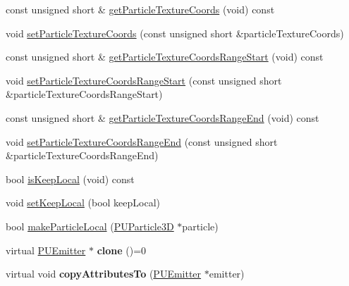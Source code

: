 \begin{DoxyCompactItemize}
\item 
const unsigned short \& \hyperlink{classPUEmitter_a0d3882c1739c1252b6524ac65db23199}{get\+Particle\+Texture\+Coords} (void) const
\item 
void \hyperlink{classPUEmitter_a400b39eba5fa388728c51eda60b11163}{set\+Particle\+Texture\+Coords} (const unsigned short \&particle\+Texture\+Coords)
\item 
const unsigned short \& \hyperlink{classPUEmitter_adc3c964789b1972f9488d8aef6cf860d}{get\+Particle\+Texture\+Coords\+Range\+Start} (void) const
\item 
void \hyperlink{classPUEmitter_a52c268b861b30c2870665e13df528015}{set\+Particle\+Texture\+Coords\+Range\+Start} (const unsigned short \&particle\+Texture\+Coords\+Range\+Start)
\item 
const unsigned short \& \hyperlink{classPUEmitter_a005ddbb5f416e9f4843f9545d861bd46}{get\+Particle\+Texture\+Coords\+Range\+End} (void) const
\item 
void \hyperlink{classPUEmitter_adedd188e230448e37af079e08833d23e}{set\+Particle\+Texture\+Coords\+Range\+End} (const unsigned short \&particle\+Texture\+Coords\+Range\+End)
\item 
bool \hyperlink{classPUEmitter_a6562e7de28fec95a73a66e7d1e59cc57}{is\+Keep\+Local} (void) const
\item 
void \hyperlink{classPUEmitter_ad53330b258cf796c7e0000089cb1a6fa}{set\+Keep\+Local} (bool keep\+Local)
\item 
bool \hyperlink{classPUEmitter_a100dc4d1701077246a469bf30f0b483f}{make\+Particle\+Local} (\hyperlink{structPUParticle3D}{P\+U\+Particle3D} $\ast$particle)
\item 
\mbox{\label{classPUEmitter_aad71994880c0fdd33a2f6e892026347c}} 
virtual \hyperlink{classPUEmitter}{P\+U\+Emitter} $\ast$ {\bfseries clone} ()=0
\item 
\mbox{\label{classPUEmitter_a3c9d3c269bca508246b8c6689d2893ae}} 
virtual void {\bfseries copy\+Attributes\+To} (\hyperlink{classPUEmitter}{P\+U\+Emitter} $\ast$emitter)
\end{DoxyCompactItemize}
